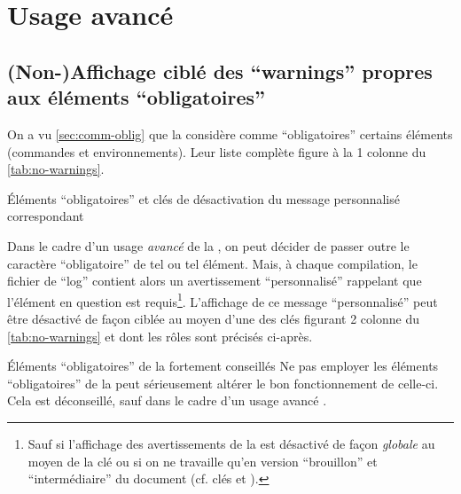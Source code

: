 \chapter{Usage avancé}\label{cha:usage-avance}

\section{(Non-)Affichage ciblé des \foreignquote{english}{warnings} propres aux
  éléments \enquote{obligatoires}}\label{sec:non-affichage-cible}

On a vu \vref{sec:comm-oblig} que la \yatcl{} considère comme
\enquote{obligatoires} certains éléments (commandes et environnements). Leur
liste complète figure à la 1\iere{} colonne du \vref{tab:no-warnings}.
\begin{table}[ht]
  \centering
  
  \caption{Éléments \enquote{obligatoires} et clés de désactivation du message
    personnalisé correspondant}
  \label{tab:no-warnings}
\end{table}

Dans le cadre d'un usage \emph{avancé} de la \yatcl{}, on peut décider de
passer outre le caractère \enquote{obligatoire} de tel ou tel élément.  Mais,
à chaque compilation, le fichier de \enquote{log} contient alors un
avertissement \enquote{personnalisé} rappelant que l'élément en question est
requis\footnote{Sauf si l'affichage des avertissements de la \yatcl{} est
  désactivé de façon \emph{globale} au moyen de la clé  ou si
  on ne travaille qu'en version \enquote{brouillon} et \enquote{intermédiaire}
  du document (cf. clés  et ).}.
L'affichage de ce message \enquote{personnalisé} peut être désactivé de façon
ciblée au moyen d'une des clés figurant 2\ieme{} colonne du
\vref{tab:no-warnings} et dont les rôles sont précisés ci-après.

\begin{dbwarning}{Éléments \enquote{obligatoires} de la \yatcl{}
    fortement conseillés}{}
  Ne pas employer les éléments \enquote{obligatoires} de la \yatcl{} peut
  sérieusement altérer le bon fonctionnement de celle-ci. Cela est déconseillé,
  sauf dans le cadre d'un usage avancé .
\end{dbwarning}


